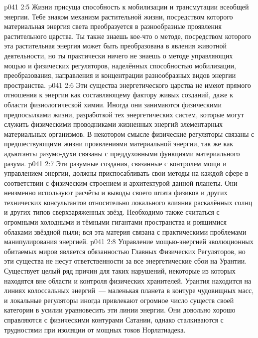 \vs p041 2:5 Жизни присуща способность к мобилизации и трансмутации всеобщей энергии. Тебе знаком механизм растительной жизни, посредством которого материальная энергия света преобразуется в разнообразные проявления растительного царства. Ты также знаешь кое-что о методе, посредством которого эта растительная энергия может быть преобразована в явления животной деятельности, но ты практически ничего не знаешь о методе управляющих мощью и физических регуляторов, наделённых способностью мобилизации, преобразования, направления и концентрации разнообразных видов энергии пространства.
\vs p041 2:6 \pc Эти существа энергетического царства не имеют прямого отношения к энергии как составляющему фактору живых созданий, даже к области физиологической химии. Иногда они занимаются физическими предпосылками жизни, разработкой тех энергетических систем, которые могут служить физическими проводниками жизненных энергий элементарных материальных организмов. В некотором смысле физические регуляторы связаны с предшествующими жизни проявлениями материальной энергии, так же как адъютанты разумо\hyp{}духи связаны с преддуховными функциями материального разума.
\vs p041 2:7 \pc Эти разумные создания, связанные с контролем мощи и управлением энергии, должны приспосабливать свои методы на каждой сфере в соответствии с физическим строением и архитектурой данной планеты. Они неизменно используют расчёты и выводы своего штата физиков и других технических консультантов относительно локального влияния раскалённых солнц и других типов сверхзаряженных звёзд. Необходимо также считаться с огромными холодными и тёмными гигантами пространства и роящимися облаками звёздной пыли; вся эта материя связана с практическими проблемами манипулирования энергией.
\vs p041 2:8 Управление мощью\hyp{}энергией эволюционных обитаемых миров является обязанностью Главных Физических Регуляторов, но эти существа не несут ответственности за все энергетические сбои на Урантии. Существует целый ряд причин для таких нарушений, некоторые из которых находятся вне области и контроля физических хранителей. Урантия находится на линиях колоссальных энергий~--- маленькая планета в контуре чудовищных масс, и локальные регуляторы иногда привлекают огромное число существ своей категории в усилии уравновесить эти линии энергии. Они довольно хорошо справляются с физическими контурами Сатании, однако сталкиваются с трудностями при изоляции от мощных токов Норлатиадека.
